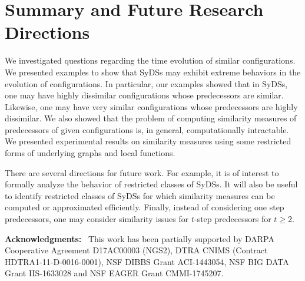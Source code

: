 \section{Summary and Future Research Directions}
\label{sec:concl}

We investigated questions regarding the time evolution of
similar configurations.
We presented examples to show that SyDSs may exhibit
extreme behaviors in the evolution of configurations. 
In particular, our examples showed that in SyDSs, one may have
highly dissimilar configurations whose predecessors are similar.
Likewise, one may have very similar configurations whose predecessors
are highly dissimilar.
We also showed that the problem of computing similarity
measures of predecessors of given configurations is, in general,
computationally intractable.
We presented experimental results on similarity measures using
some restricted forms of underlying graphs and local functions.

There are several directions for future work.
For example, it is of interest to formally analyze the
behavior of restricted classes of SyDSs.
It will also be useful to identify restricted classes of SyDSs
for which similarity measures can be computed or approximated efficiently.
Finally, instead of considering one step predecessors, one may consider 
similarity issues for $t$-step predecessors for $t \geq 2$.

\smallskip

\noindent
\textbf{Acknowledgments:}~
This work has been partially supported by
DARPA Cooperative Agreement D17AC00003 (NGS2),
DTRA CNIMS (Contract HDTRA1-11-D-0016-0001),
NSF DIBBS Grant ACI-1443054,
NSF BIG DATA Grant IIS-1633028 and
NSF EAGER Grant CMMI-1745207.


